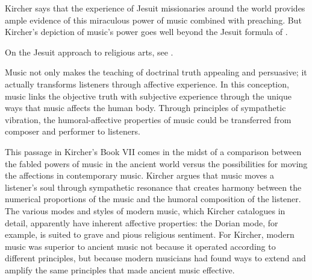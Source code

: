 Kircher says that the experience of Jesuit missionaries around the world 
provides ample evidence of this miraculous power of music combined with 
preaching.
But Kircher's depiction of music's power goes well beyond the Jesuit formula of 
.%
\begin{Footnote}
    On the Jesuit approach to religious arts, see \autocite[35--51]{Bailey:Art}.
\end{Footnote}
Music not only makes the teaching of doctrinal truth appealing and persuasive; 
it actually transforms listeners through affective experience.
In this conception, music links the objective truth with subjective experience 
through the unique ways that music affects the human body.
Through principles of sympathetic vibration, the humoral-affective properties 
of music could be transferred from composer and performer to listeners.

This passage in Kircher's Book VII comes in the midst of a comparison between 
the fabled powers of music in the ancient world versus the possibilities for 
moving the affections in contemporary music.
Kircher argues that music moves a listener's soul through sympathetic resonance 
that creates harmony between the numerical proportions of the music and the 
humoral composition of the listener.
The various modes and styles of modern music, which Kircher catalogues in 
detail, apparently have inherent affective properties: the Dorian mode, for 
example, is suited to grave and pious religious sentiment.
For Kircher, modern music was superior to ancient music not because it operated 
according to different principles, but because modern musicians had found ways 
to extend and amplify the same principles that made ancient music effective.

